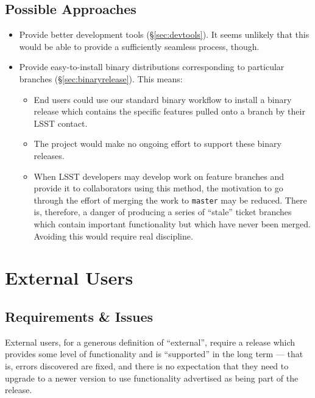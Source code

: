 \documentclass[letterpaper]{scrartcl}
\begin{document}
\subsection{Possible Approaches}

\begin{itemize}

  \item{Provide better development tools (\S\ref{sec:devtools}). It seems
  unlikely that this would be able to provide a sufficiently seamless process,
  though.}

  \item{Provide easy-to-install binary distributions corresponding to
  particular branches (\S\ref{sec:binaryrelease}). This means:

    \begin{itemize}

      \item{End users could use our standard binary workflow to install a
      binary release which contains the specific features pulled onto a branch
      by their LSST contact.}

      \item{The project would make no ongoing effort to support these binary
      releases.}

      \item{When LSST developers may develop work on feature branches and
      provide it to collaborators using this method, the motivation to go
      through the effort of merging the work to \texttt{master} may be
      reduced. There is, therefore, a danger of producing a series of
      ``stale'' ticket branches which contain important functionality but
      which have never been merged. Avoiding this would require real
      discipline.}

    \end{itemize}

  }

\end{itemize}

\section{External Users}
\label{sec:externals}

\subsection{Requirements \& Issues}

External users, for a generous definition of ``external'', require a release
which provides some level of functionality and is ``supported'' in the long
term --- that is, errors discovered are fixed, and there is no expectation
that they need to upgrade to a newer version to use functionality advertised
as being part of the release.
\end{document}
